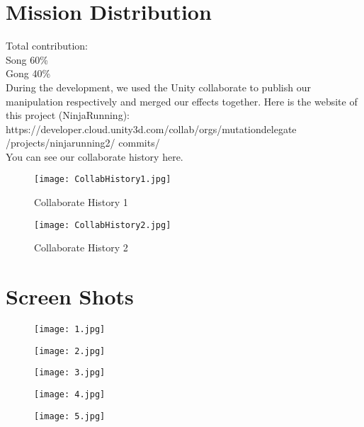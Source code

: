 \documentclass{article}
\begin{document}
\section{Mission Distribution}
Total contribution:\\
Song 60\%\\
Gong 40\%\\
During the development, we used the Unity collaborate to publish our manipulation respectively and merged our effects together. Here is the website of this project (Ninja\-Running):\\
https://developer.cloud.unity3d.com/col\-lab/orgs/mutation\-delegate\\
/projects/ninja\-running2/ commits/\\
You can see our collaborate history here.
\begin{figure}[tb]
    \centering
    \texttt{[image: CollabHistory1.jpg]}
    \caption{Collaborate History 1}
\end{figure}
\begin{figure}[tb]
    \centering
    \texttt{[image: CollabHistory2.jpg]}
    \caption{Collaborate History 2}
\end{figure}
\clearpage



\section{Screen Shots}
\begin{figure}[tb]
    \centering
    \texttt{[image: 1.jpg]}
\end{figure}
\begin{figure}[tb]
    \centering
    \texttt{[image: 2.jpg]}
\end{figure}
\begin{figure}[tb]
    \centering
    \texttt{[image: 3.jpg]}
\end{figure}
\begin{figure}[tb]
    \centering
    \texttt{[image: 4.jpg]}
\end{figure}
\begin{figure}[tb]
    \centering
    \texttt{[image: 5.jpg]}
\end{figure}
\end{document}
